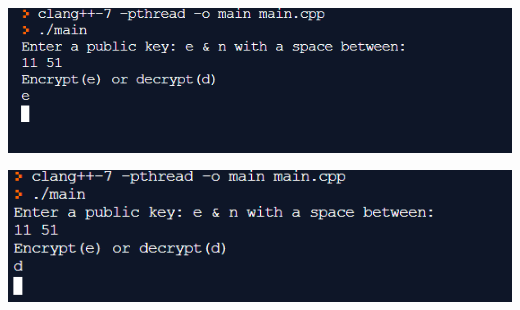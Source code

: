 \documentclass{article}
\begin{document}
\begin{solution}
\includegraphics[width=16cm, height=4cm]{s.png}\\
\includegraphics[width=16cm, height=4cm]{ss.png}\\
\end{solution}
\end{document}
